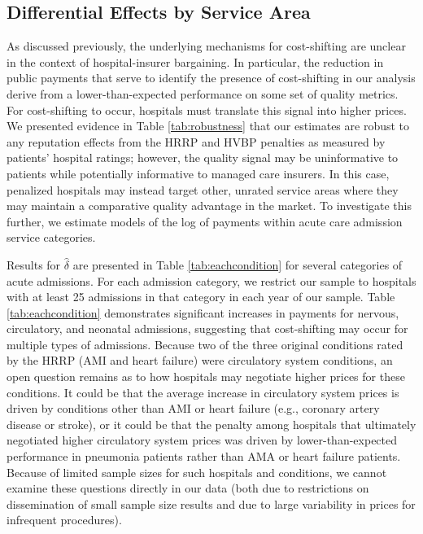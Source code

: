 \documentclass[12pt]{article}
\begin{document}
\subsection{Differential Effects by Service Area}
As discussed previously, the underlying mechanisms for cost-shifting are unclear in the context of hospital-insurer bargaining. In particular, the reduction in public payments that serve to identify the presence of cost-shifting in our analysis derive from a lower-than-expected performance on some set of quality metrics. For cost-shifting to occur, hospitals must translate this signal into higher prices. We presented evidence in Table \ref{tab:robustness} that our estimates are robust to any reputation effects from the HRRP and HVBP penalties as measured by patients' hospital ratings; however, the quality signal may be uninformative to patients while potentially informative to managed care insurers. In this case, penalized hospitals may instead target other, unrated service areas where they may maintain a comparative quality advantage in the market. To investigate this further, we estimate models of the log of payments within acute care admission service categories.

Results for $\hat{\delta}$ are presented in Table \ref{tab:eachcondition} for several categories of acute admissions. For each admission category, we restrict our sample to hospitals with at least 25 admissions in that category in each year of our sample. Table \ref{tab:eachcondition} demonstrates significant increases in payments for nervous, circulatory, and neonatal admissions, suggesting that cost-shifting may occur for multiple types of admissions. Because two of the three original conditions rated by the HRRP (AMI and heart failure) were circulatory system conditions, an open question remains as to how hospitals may negotiate higher prices for these conditions. It could be that the average increase in circulatory system prices is driven by conditions other than AMI or heart failure (e.g., coronary artery disease or stroke), or it could be that the penalty among hospitals that ultimately negotiated higher circulatory system prices was driven by lower-than-expected performance in pneumonia patients rather than AMA or heart failure patients. Because of limited sample sizes for such hospitals and conditions, we cannot examine these questions directly in our data (both due to restrictions on dissemination of small sample size results and due to large variability in prices for infrequent procedures).
\end{document}
